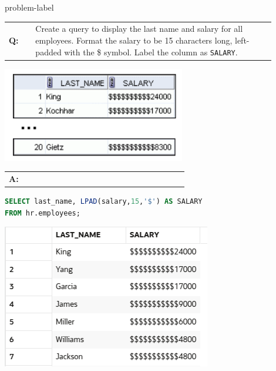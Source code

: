\begin{problem}{}{problem-label}

\begin{tabular}{@{}l p{0.9\linewidth}@{}}
  \textbf{Q:} & Create a query to display the last name and salary for all employees. Format the salary to be 15
characters long, left-padded with the \$ symbol. Label the column as \texttt{SALARY}.
\end{tabular}

\begin{center}
  \includegraphics[scale=0.8]{images/c3q7.png}
\end{center}

\begin{tabular}{@{}l p{0.9\linewidth}@{}}
  \textbf{A:} & 
\end{tabular}


\begin{lstlisting}[language=SQL]
SELECT last_name, LPAD(salary,15,'$') AS SALARY
FROM hr.employees;

\end{lstlisting}

\vspace{1em}

\begin{center}
  \includegraphics[scale=0.8]{images/c3a7.png}
\end{center}

\end{problem}

